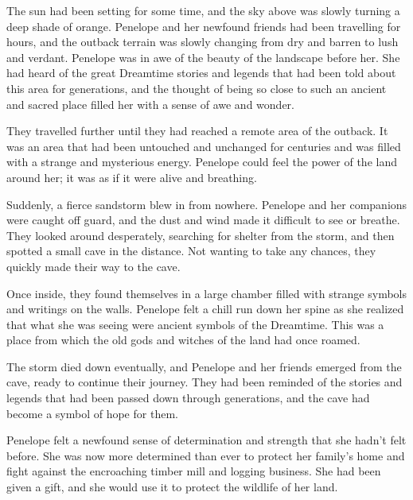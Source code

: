 

The sun had been setting for some time, and the sky above was slowly turning a deep shade of orange. Penelope and her newfound friends had been travelling for hours, and the outback terrain was slowly changing from dry and barren to lush and verdant. Penelope was in awe of the beauty of the landscape before her. She had heard of the great Dreamtime stories and legends that had been told about this area for generations, and the thought of being so close to such an ancient and sacred place filled her with a sense of awe and wonder.

They travelled further until they had reached a remote area of the outback. It was an area that had been untouched and unchanged for centuries and was filled with a strange and mysterious energy. Penelope could feel the power of the land around her; it was as if it were alive and breathing.

Suddenly, a fierce sandstorm blew in from nowhere. Penelope and her companions were caught off guard, and the dust and wind made it difficult to see or breathe. They looked around desperately, searching for shelter from the storm, and then spotted a small cave in the distance. Not wanting to take any chances, they quickly made their way to the cave.

Once inside, they found themselves in a large chamber filled with strange symbols and writings on the walls. Penelope felt a chill run down her spine as she realized that what she was seeing were ancient symbols of the Dreamtime. This was a place from which the old gods and witches of the land had once roamed.

The storm died down eventually, and Penelope and her friends emerged from the cave, ready to continue their journey. They had been reminded of the stories and legends that had been passed down through generations, and the cave had become a symbol of hope for them.

 Penelope felt a newfound sense of determination and strength that she hadn’t felt before. She was now more determined than ever to protect her family’s home and fight against the encroaching timber mill and logging business. She had been given a gift, and she would use it to protect the wildlife of her land.